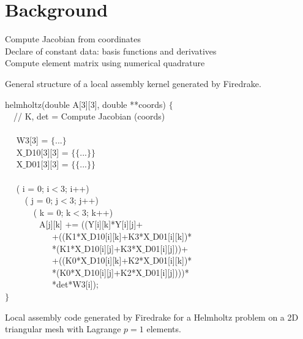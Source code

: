 \documentclass[conference]{IEEEtran}
\begin{document}
\section{Background}
\label{sec:background}

\begin{algorithm}[t]
\small
{}
Compute Jacobian from coordinates \\
Declare of constant data: basis functions and derivatives\\
Compute element matrix using numerical quadrature
\caption{General structure of a local assembly kernel generated by Firedrake.}
\label{code:general-structure}
\end{algorithm}

\begin{algorithm}[t]
\small
{} helmholtz(double A[3][3], double **coords) $\lbrace$\\
~~// K, det = Compute Jacobian (coords) \\
~~\\
~~ W3[3] = $\lbrace$...$\rbrace$\\
~~ X$\_$D10[3][3] = $\lbrace\lbrace$...$\rbrace\rbrace$\\
~~ X$\_$D01[3][3] = $\lbrace\lbrace$...$\rbrace\rbrace$\\
~~\\
~~ ( i = 0; i$<$3; i++) \\
~~~~ ( j = 0; j$<$3; j++) \\
~~~~~~ ( k = 0; k$<$3; k++) \\
~~~~~~~~A[j][k] += ((Y[i][k]*Y[i][j]+\\
~~~~~~~~~~~+((K1*X$\_$D10[i][k]+K3*X$\_$D01[i][k])*\\
~~~~~~~~~~~*(K1*X$\_$D10[i][j]+K3*X$\_$D01[i][j]))+\\
~~~~~~~~~~~+((K0*X$\_$D10[i][k]+K2*X$\_$D01[i][k])*\\
~~~~~~~~~~~*(K0*X$\_$D10[i][j]+K2*X$\_$D01[i][j])))*\\
~~~~~~~~~~~*det*W3[i]);\\
$\rbrace$
\caption{Local assembly code generated by Firedrake for a Helmholtz problem on a 2D triangular mesh with Lagrange $p=1$ elements.}
\label{code:helmholtz}
\end{algorithm}
\end{document}
